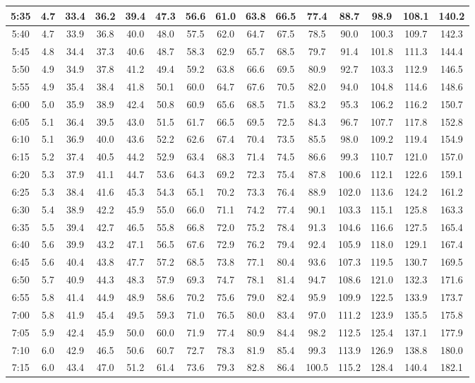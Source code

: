 \begin{footnotesize}
\begin{tabular}{c | c | c | c | c | c | c | c | c | c | c | c | c | c | c}
		5:35&4.7&33.4&36.2&39.4&47.3&56.6&61.0&63.8&66.5&77.4&88.7&98.9&108.1&140.2\\\hline
		5:40&4.7&33.9&36.8&40.0&48.0&57.5&62.0&64.7&67.5&78.5&90.0&100.3&109.7&142.3\\\hline
		5:45&4.8&34.4&37.3&40.6&48.7&58.3&62.9&65.7&68.5&79.7&91.4&101.8&111.3&144.4\\\hline
		5:50&4.9&34.9&37.8&41.2&49.4&59.2&63.8&66.6&69.5&80.9&92.7&103.3&112.9&146.5\\\hline
		5:55&4.9&35.4&38.4&41.8&50.1&60.0&64.7&67.6&70.5&82.0&94.0&104.8&114.6&148.6\\\hline
		6:00&5.0&35.9&38.9&42.4&50.8&60.9&65.6&68.5&71.5&83.2&95.3&106.2&116.2&150.7\\\hline
		6:05&5.1&36.4&39.5&43.0&51.5&61.7&66.5&69.5&72.5&84.3&96.7&107.7&117.8&152.8\\\hline
		6:10&5.1&36.9&40.0&43.6&52.2&62.6&67.4&70.4&73.5&85.5&98.0&109.2&119.4&154.9\\\hline
		6:15&5.2&37.4&40.5&44.2&52.9&63.4&68.3&71.4&74.5&86.6&99.3&110.7&121.0&157.0\\\hline
		6:20&5.3&37.9&41.1&44.7&53.6&64.3&69.2&72.3&75.4&87.8&100.6&112.1&122.6&159.1\\\hline
		6:25&5.3&38.4&41.6&45.3&54.3&65.1&70.2&73.3&76.4&88.9&102.0&113.6&124.2&161.2\\\hline
		6:30&5.4&38.9&42.2&45.9&55.0&66.0&71.1&74.2&77.4&90.1&103.3&115.1&125.8&163.3\\\hline
		6:35&5.5&39.4&42.7&46.5&55.8&66.8&72.0&75.2&78.4&91.3&104.6&116.6&127.5&165.4\\\hline
		6:40&5.6&39.9&43.2&47.1&56.5&67.6&72.9&76.2&79.4&92.4&105.9&118.0&129.1&167.4\\\hline
		6:45&5.6&40.4&43.8&47.7&57.2&68.5&73.8&77.1&80.4&93.6&107.3&119.5&130.7&169.5\\\hline
		6:50&5.7&40.9&44.3&48.3&57.9&69.3&74.7&78.1&81.4&94.7&108.6&121.0&132.3&171.6\\\hline
		6:55&5.8&41.4&44.9&48.9&58.6&70.2&75.6&79.0&82.4&95.9&109.9&122.5&133.9&173.7\\\hline
		7:00&5.8&41.9&45.4&49.5&59.3&71.0&76.5&80.0&83.4&97.0&111.2&123.9&135.5&175.8\\\hline
		7:05&5.9&42.4&45.9&50.0&60.0&71.9&77.4&80.9&84.4&98.2&112.5&125.4&137.1&177.9\\\hline
		7:10&6.0&42.9&46.5&50.6&60.7&72.7&78.3&81.9&85.4&99.3&113.9&126.9&138.8&180.0\\\hline
		7:15&6.0&43.4&47.0&51.2&61.4&73.6&79.3&82.8&86.4&100.5&115.2&128.4&140.4&182.1\\\hline

\end{tabular}
\end{footnotesize}
